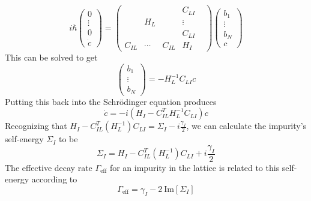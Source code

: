 \documentclass[aps,pra,superscriptaddress,twocolumn]{revtex4-1}
\newcommand{\im}{\mathrm{Im}}
\newcommand{\commentSB}[1]{\texttt{\color{blue}[#1]}}
\begin{document}
\begin{equation} i \hbar 
    \begin{pmatrix}
    0 \\ \vdots \\ 0 \\ \dot{c}
    \end{pmatrix} = \begin{pmatrix}
        ~ & ~ & ~ &   C_{LI} \\ 
        ~ & H_L & ~ & \vdots \\
        ~ & ~ & ~ & C_{LI} & \\
        C_{IL} & \cdots & C_{IL} & H_I   
    \end{pmatrix} \begin{pmatrix}
        b_1 \\ \vdots \\ b_N \\ c
    \end{pmatrix} 
\end{equation}
This can be solved to get 
\begin{equation}
    \begin{pmatrix}
        b_1 \\ \vdots \\ b_N
    \end{pmatrix} = - H_L^{-1} C_{LI} c
\end{equation}
Putting this back into the Schr\"odinger equation produces 
\begin{equation}
    \dot{c} = -i (H_I - C_{IL}^T H_L^{-1}C_{LI}) c
\end{equation}
Recognizing that $ H_I - C_{IL}^T (H_L^{-1}) C_{LI} = \Sigma_I - i \frac{\gamma_I}{2} $, we can calculate the impurity's self-energy $\Sigma_I$ to be 
\begin{equation}
    \Sigma_I = H_I - C_{IL}^T (H_L^{-1}) C_{LI} + i \frac{\gamma_I}{2}
    \label{eqn:selfenergy}
\end{equation}
The effective decay rate $\Gamma_\text{eff}$ for an impurity in the lattice is related to this self-energy according to 
\begin{equation}
    \Gamma_\text{eff} = \gamma_I - 2~\im[\Sigma_I]
\end{equation}
\end{document}
